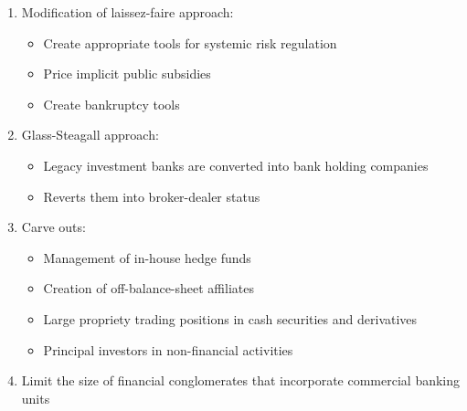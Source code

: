 \documentclass[11pt]{beamer}
\begin{document}

\begin{frame}
\begin{enumerate}
\item Modification of laissez-faire approach:
\begin{itemize}
\item Create appropriate tools for systemic risk regulation
\item Price implicit public subsidies
\item Create bankruptcy tools
\end{itemize}
\vspace{3mm}
\item Glass-Steagall approach:
\begin{itemize}
\item Legacy investment banks are converted into bank holding companies
\item Reverts them into broker-dealer status
\end{itemize}
\vspace{3mm}
\item Carve outs:
\begin{itemize}
\item Management of in-house hedge funds
\item Creation of off-balance-sheet affiliates
\item Large propriety trading positions in cash securities and derivatives
\item Principal investors in non-financial activities
\end{itemize}
\vspace{3mm}

\item Limit the size of financial conglomerates that incorporate commercial banking units
\end{enumerate}
\end{frame}

\end{document}
